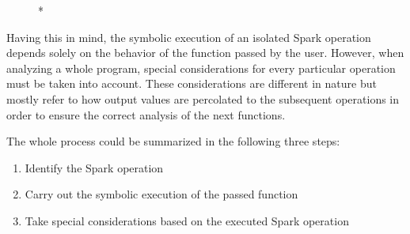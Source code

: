 \begin{figure}[t]
	\centering
	\begin{tikzpicture}[node distance = 5cm, auto]
	\end{tikzpicture}
	
	\begin{minipage}[t]{\linewidth}
	\end{minipage}
	\vspace{\belowdisplayskip}
	
	\begin{tikzpicture}[node distance = 4.7cm, auto]
	\end{tikzpicture}
	
	\begin{minipage}[t]{\linewidth}
	\end{minipage}
	
	\caption[*]{*}
\end{figure}

Having this in mind, the symbolic execution of an isolated Spark operation depends solely on the behavior of the function passed by the user. However, when analyzing a whole program, special considerations for every particular operation must be taken into account. These considerations are different in nature but mostly refer to how output values are percolated to the subsequent operations in order to ensure the correct analysis of the next functions.

The whole process could be summarized in the following three steps:
\begin{enumerate}
	\item Identify the Spark operation
	\item Carry out the symbolic execution of the passed function
	\item Take special considerations based on the executed Spark operation
\end{enumerate}